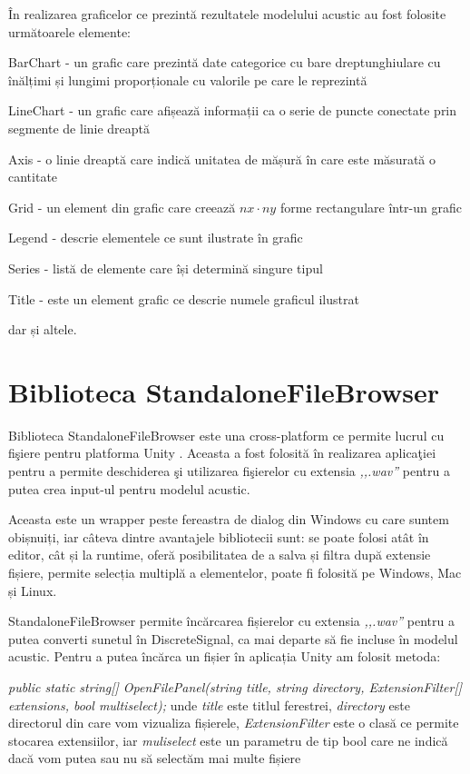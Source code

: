 	În realizarea graficelor ce prezintă rezultatele modelului acustic au fost folosite următoarele elemente:
	
	\begin{itemize}
		\utb BarChart - un grafic care prezintă date categorice cu bare dreptunghiulare cu înălțimi și lungimi proporționale cu valorile pe care le reprezintă
		
		\utb LineChart -  un grafic care afișează informații ca o serie de puncte conectate prin segmente de linie dreaptă
		
		\utb Axis -  o linie dreaptă care indică unitatea de mășură în care este măsurată o cantitate
		
		\utb Grid - un element din grafic care creează $nx\cdot ny$ forme rectangulare într-un grafic
		
		\utb Legend - descrie elementele ce sunt ilustrate în grafic
		
		\utb Series - listă de elemente care își determină singure tipul
		
		\utb Title - este un element grafic ce descrie numele graficul ilustrat
	\end{itemize}

	\noindent dar și altele.
	
\section{Biblioteca StandaloneFileBrowser}
	 
	Biblioteca StandaloneFileBrowser este una cross-platform ce permite lucrul cu fi\c{s}iere pentru platforma Unity \cite{standalone}. Aceasta a fost folosit\u{a} \^{i}n realizarea aplica\c{t}iei pentru a permite deschiderea \c{s}i utilizarea fi\c{s}ierelor cu extensia \textit{,,.wav''} pentru a putea crea input-ul pentru modelul acustic.
	
	Aceasta este un wrapper peste fereastra de dialog din Windows cu care suntem obișnuiți, iar câteva dintre avantajele bibliotecii sunt: se poate folosi atât în editor, cât și la runtime, oferă posibilitatea de a salva și filtra după extensie fișiere, permite selecția multiplă a elementelor, poate fi folosită pe Windows, Mac și Linux.
	
	StandaloneFileBrowser permite încărcarea fișierelor cu extensia \textit{,,.wav''} pentru a putea converti sunetul în DiscreteSignal, ca mai departe să fie incluse în modelul acustic. Pentru a putea încărca un fișier în aplicația Unity am folosit metoda:
	
	\begin{itemize}
		\utb \textit{  public static string[] OpenFilePanel(string title, string directory, ExtensionFilter[] extensions, bool multiselect);} unde \textit{title} este titlul ferestrei, \textit{directory} este directorul din care vom vizualiza fișierele, \textit{ExtensionFilter} este o clasă ce permite stocarea extensiilor, iar \textit{muliselect} este un parametru de tip bool care ne indică dacă vom putea sau nu să selectăm mai multe fișiere
	\end{itemize}
	
